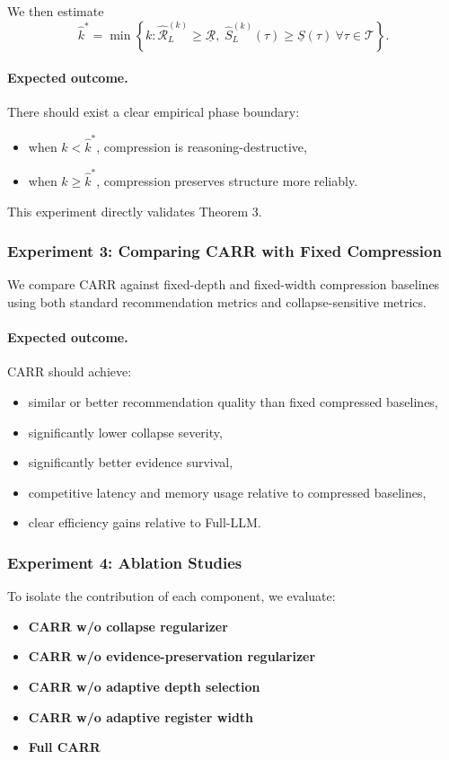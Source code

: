 \documentclass[11pt]{article}
\begin{document}
We then estimate
\[
\hat{k}^*
=
\min
\left\{
k :
\widehat{\mathcal{R}}_L^{(k)} \ge \underline{\mathcal{R}},
\;
\widehat{S}_L^{(k)}(\tau)\ge \underline{S}(\tau)
\ \forall \tau \in \mathcal{T}
\right\}.
\]

\paragraph{Expected outcome.}
There should exist a clear empirical phase boundary:
\begin{itemize}
    \item when $k < \hat{k}^*$, compression is reasoning-destructive,
    \item when $k \ge \hat{k}^*$, compression preserves structure more reliably.
\end{itemize}

This experiment directly validates Theorem 3.

\subsubsection{Experiment 3: Comparing CARR with Fixed Compression}

We compare CARR against fixed-depth and fixed-width compression baselines using both standard recommendation metrics and collapse-sensitive metrics.

\paragraph{Expected outcome.}
CARR should achieve:
\begin{itemize}
    \item similar or better recommendation quality than fixed compressed baselines,
    \item significantly lower collapse severity,
    \item significantly better evidence survival,
    \item competitive latency and memory usage relative to compressed baselines,
    \item clear efficiency gains relative to Full-LLM.
\end{itemize}

\subsubsection{Experiment 4: Ablation Studies}

To isolate the contribution of each component, we evaluate:
\begin{itemize}
    \item \textbf{CARR w/o collapse regularizer}
    \item \textbf{CARR w/o evidence-preservation regularizer}
    \item \textbf{CARR w/o adaptive depth selection}
    \item \textbf{CARR w/o adaptive register width}
    \item \textbf{Full CARR}
\end{itemize}
\end{document}
